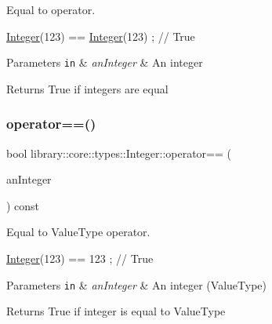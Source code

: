 Equal to operator. 


\begin{DoxyCode}
\hyperlink{classlibrary_1_1core_1_1types_1_1Integer_a6483b1c4e13e5ed6af5e7a58347efead}{Integer}(123) == \hyperlink{classlibrary_1_1core_1_1types_1_1Integer_a6483b1c4e13e5ed6af5e7a58347efead}{Integer}(123) ; \textcolor{comment}{// True}
\end{DoxyCode}



\begin{DoxyParams}[1]{Parameters}
\mbox{\tt in}  & {\em an\+Integer} & An integer \\
\hline
\end{DoxyParams}
\begin{DoxyReturn}{Returns}
True if integers are equal 
\end{DoxyReturn}
\mbox{\label{classlibrary_1_1core_1_1types_1_1Integer_a02858e726140a9e84281699a41675081}} 
\subsubsection{\texorpdfstring{operator==()}{operator==()}\hspace{0.1cm}{\footnotesize\ttfamily [2/2]}}
{\footnotesize\ttfamily bool library\+::core\+::types\+::\+Integer\+::operator== (\begin{DoxyParamCaption}\item[{const \hyperlink{classlibrary_1_1core_1_1types_1_1Integer_a623afb1580f870fd8a1997b1c12c917d}{Integer\+::\+Value\+Type} \&}]{an\+Integer }\end{DoxyParamCaption}) const}



Equal to Value\+Type operator. 


\begin{DoxyCode}
\hyperlink{classlibrary_1_1core_1_1types_1_1Integer_a6483b1c4e13e5ed6af5e7a58347efead}{Integer}(123) == 123 ; \textcolor{comment}{// True}
\end{DoxyCode}



\begin{DoxyParams}[1]{Parameters}
\mbox{\tt in}  & {\em an\+Integer} & An integer (Value\+Type) \\
\hline
\end{DoxyParams}
\begin{DoxyReturn}{Returns}
True if integer is equal to Value\+Type 
\end{DoxyReturn}
\mbox{\label{classlibrary_1_1core_1_1types_1_1Integer_aa5e59aba88550137a1b120e90ab155fa}} 
